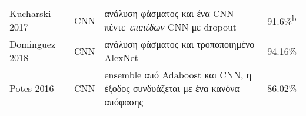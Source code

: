 \begin{sidewaystable}
\begin{tabular}{l c l l}
		Kucharski 2017~\cite{kucharski2017deep}      & CNN             & ανάλυση φάσματος και ένα CNN πέντε~\textit{επιπέδων} CNN με dropout                                                                                                                                                                                                                                                                                      & 91.6\%\textsuperscript{b}                                                                                                                                                                                                                                                                                                                                                                                                                                                                                             \\
		Dominguez 2018~\cite{dominguez2018deep}      & CNN             & ανάλυση φάσματος και τροποποιημένο AlexNet                                                                                                                                                                                                                                                                                                              & 94.16\%                                                                                                                                                                                                                                                                                                                                                                                                                                                                                                                    \\
		Potes 2016~\cite{potes2016ensemble}          & CNN             & ensemble από Adaboost και CNN, η έξοδος συνδυάζεται με ένα κανόνα απόφασης                                                                                                                                                                                                                                                                               & 86.02\%                                                                                                                                                                                                                                                                                                                                                                                                                                                                                                                    \\

\end{tabular}
\end{sidewaystable}
